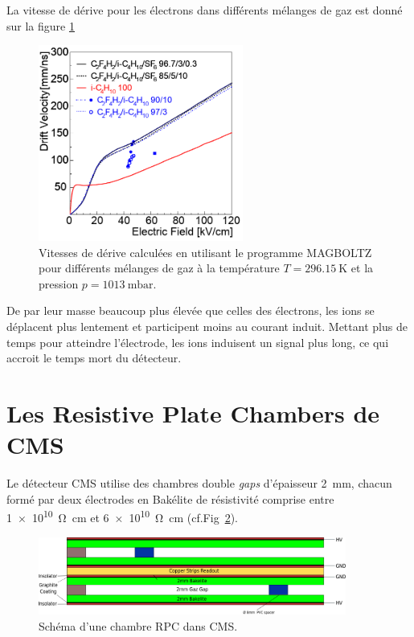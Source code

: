 La vitesse de dérive pour les électrons dans différents mélanges de gaz est donné sur la figure \ref{drift} \cite{Riegler:570462}

\begin{figure}[ht!]
	\centering
	\includegraphics[width=0.60\textwidth]{RPC/drift.png}
	\captionsetup{type=figure}\caption{Vitesses de dérive calculées en utilisant le programme MAGBOLTZ \cite{MAGBOLTZ} pour différents mélanges de gaz à la température $T=\SI{296.15}{\kelvin}$ et la pression $p=\SI{1013}{\milli\bar}$.}
	\label{drift}
\end{figure}

De par leur masse beaucoup plus élevée que celles des électrons, les ions se déplacent plus lentement et participent moins au courant induit. Mettant plus de temps pour atteindre l'électrode, les ions induisent un signal plus long, ce qui accroit le temps mort du détecteur.%

\section{Les Resistive Plate Chambers de CMS}

Le détecteur CMS utilise des chambres double \textit{gaps} d'épaisseur \SI{2}{\milli\meter}, chacun formé par deux électrodes en Bakélite de résistivité comprise entre \SI{1e10}{\ohm\centi\meter} et \SI{6e10}{\ohm\centi\meter} (cf.Fig~\ref{cmsrpc}). 

\begin{figure}[ht!]
	\centering
	\includegraphics[width=0.90\textwidth]{RPC/CMSRPC.png}
	\captionsetup{type=figure}\caption{Schéma d'une chambre RPC dans CMS.}
	\label{cmsrpc}
\end{figure}

